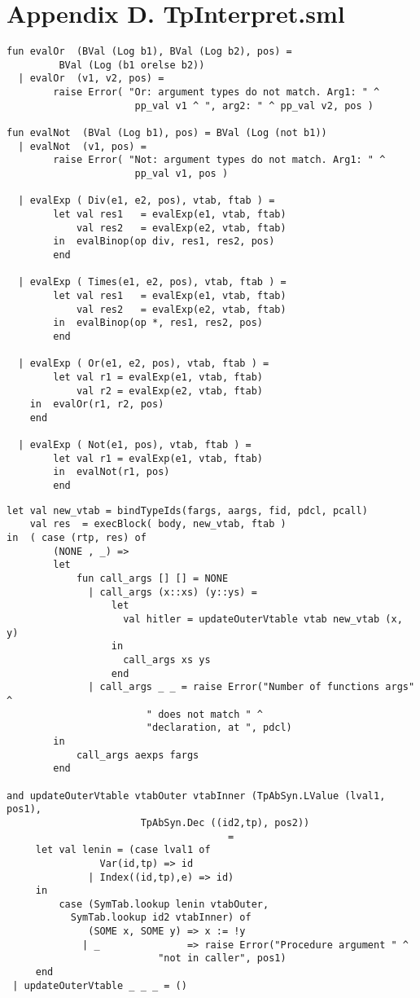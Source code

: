 \documentclass[12pt,a4paper,english]{article}
\begin{document}
\newpage
\section{Appendix D. TpInterpret.sml}

\begin{lstlisting}[caption=TpInterpret.sml changes for task 2.]
fun evalOr  (BVal (Log b1), BVal (Log b2), pos) = 
	     BVal (Log (b1 orelse b2))
  | evalOr  (v1, v2, pos) =
        raise Error( "Or: argument types do not match. Arg1: " ^
                      pp_val v1 ^ ", arg2: " ^ pp_val v2, pos )
                      
fun evalNot  (BVal (Log b1), pos) = BVal (Log (not b1))
  | evalNot  (v1, pos) =
        raise Error( "Not: argument types do not match. Arg1: " ^
                      pp_val v1, pos )

  | evalExp ( Div(e1, e2, pos), vtab, ftab ) =
        let val res1   = evalExp(e1, vtab, ftab)
            val res2   = evalExp(e2, vtab, ftab)
        in  evalBinop(op div, res1, res2, pos)
        end

  | evalExp ( Times(e1, e2, pos), vtab, ftab ) =
        let val res1   = evalExp(e1, vtab, ftab)
            val res2   = evalExp(e2, vtab, ftab)
        in  evalBinop(op *, res1, res2, pos)
        end

  | evalExp ( Or(e1, e2, pos), vtab, ftab ) =
        let val r1 = evalExp(e1, vtab, ftab)
            val r2 = evalExp(e2, vtab, ftab)
  	in  evalOr(r1, r2, pos)
  	end
    
  | evalExp ( Not(e1, pos), vtab, ftab ) =
        let val r1 = evalExp(e1, vtab, ftab)
        in  evalNot(r1, pos)
        end
\end{lstlisting}
\newpage
\begin{lstlisting}[caption=TpInterpreter changes for task 5.]
let val new_vtab = bindTypeIds(fargs, aargs, fid, pdcl, pcall)
    val res  = execBlock( body, new_vtab, ftab )
in  ( case (rtp, res) of
        (NONE , _) =>
        let 
            fun call_args [] [] = NONE
              | call_args (x::xs) (y::ys) =
                  let 
                    val hitler = updateOuterVtable vtab new_vtab (x, y)
                  in
                    call_args xs ys
                  end
              | call_args _ _ = raise Error("Number of functions args" ^
					    " does not match " ^ 
					    "declaration, at ", pdcl)
        in 
            call_args aexps fargs  
        end

and updateOuterVtable vtabOuter vtabInner (TpAbSyn.LValue (lval1, pos1), 
					   TpAbSyn.Dec ((id2,tp), pos2)) 
								      = 
     let val lenin = (case lval1 of 
                Var(id,tp) => id
              | Index((id,tp),e) => id)
     in
         case (SymTab.lookup lenin vtabOuter, 
	       SymTab.lookup id2 vtabInner) of
              (SOME x, SOME y) => x := !y
             | _               => raise Error("Procedure argument " ^
					      "not in caller", pos1)
     end
 | updateOuterVtable _ _ _ = ()

\end{lstlisting}
\end{document}
